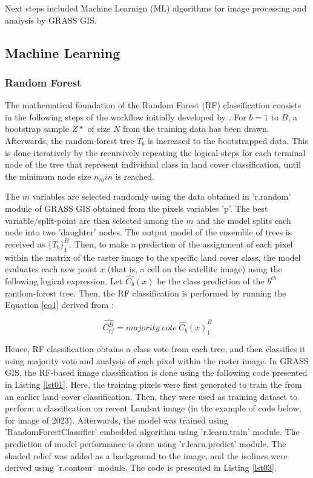 \documentclass[jmse,article,submit,pdftex,moreauthors]{Definitions/mdpi}
\begin{document}
Next steps included Machine Learnign (ML) algorithms for image processing and analysis by GRASS GIS.
\subsection{Machine Learning}

\subsubsection{Random Forest}

The mathematical foundation of the Random Forest (RF) classification consists in the following steps of the workflow initially developed by \cite{598994}. For $b=1$ to $B$, a bootstrap sample $Z*$ of size $N$ from the training data has been drawn. Afterwards, the random-forest tree $T_b$ is increased to the bootstrapped data. This is done iteratively by the recursively repeating the logical steps for each terminal node of the tree that represent individual class in land cover classification, until the minimum node size $n_min$ is reached. 

The $m$ variables are selected randomly using the data obtained in 'r.random' module of GRASS GIS obtained from the pixels variables 'p'. The best variable/split-point are then selected among the $m$ and the model splits each node into two 'daughter' nodes. The output model of the ensemble of trees is received as $\{T_b\}_1^B$. Then, to make a prediction of the assignment of each pixel within the matrix of the raster image to the specific land cover class, the model evaluates each new point $x$ (that is, a cell on the satellite image) using the following logical expression. Let $\hat{C_b}(x)$ be the class prediction of the $b^{th}$ random-forest tree. Then, the RF classification is performed by running the Equation \ref{eq1} derived from \cite{709601}:

\begin{equation}
\hat{C^B_{rf}} = majority \:  vote \:  {\hat{C_b}(x)}_1^B
\label{eq1}
\end{equation}

Hence, RF classification obtains a class vote from each tree, and then classifies it using majority vote and analysis of each pixel within the raster image. In GRASS GIS, the RF-based image classification is done using the following code presented in Listing \ref{lst01}. Here, the  training pixels were first generated to train the from an earlier land cover classification. Then, they were used as training dataset to perform a classification on recent Landsat image (in the example of code below, for image of 2023). Afterwards, the model was trained using  'RandomForestClassifier' embedded algorithm using 'r.learn.train' module. The prediction of model performance is done using 'r.learn.predict' module. The shaded relief was added as a background to the image, and the isolines were derived using 'r.contour' module. The code is presented in Listing \ref{lst03}.
\end{document}

